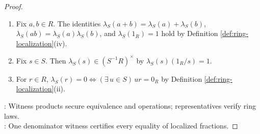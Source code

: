 \begin{proposition}
\begin{proof}
\begin{enumerate}[label=(\roman*)]
Distributivity holds by $(a/s)(b/t+c/q)=(aqb+atc)/(stq)=ab/(st)+ac/(sq)$.\\
The classes $0_R/1_R$ and $1_R/1_R$ are the identities, while $-(a/s)=(-a)/s$; hence $S^{-1}R$ is a commutative ring with identity.
\item Fix $a,b\in R$. The identities $\lambda_S(a+b)=\lambda_S(a)+\lambda_S(b)$, $\lambda_S(ab)=\lambda_S(a)\lambda_S(b)$, and $\lambda_S(1_R)=1$ hold by Definition \ref{def:ring-localization}(iv).
\item Fix $s\in S$. Then $\lambda_S(s)\in(S^{-1}R)^\times$ by $\lambda_S(s)(1_R/s)=1$.
\item For $r\in R$, $\lambda_S(r)=0\Longleftrightarrow(\exists\,u\in S)\,ur=0_R$ by Definition \ref{def:ring-localization}(ii).
\end{enumerate}
: Witness products secure equivalence and operations; representatives verify ring laws.\\
: One denominator witness certifies every equality of localized fractions.
\end{proof}
\end{proposition}

